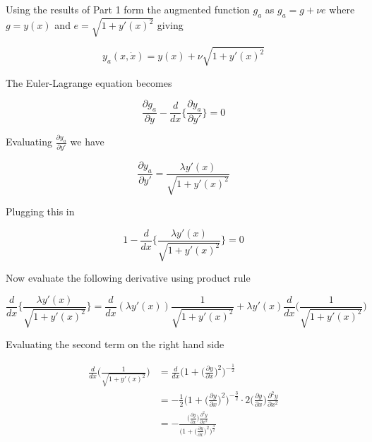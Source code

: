 \documentclass[11pt,letterpaper,onecolumn,notitlepage]{article}
\begin{document}
Using the results of Part 1 form the augmented function $g_{a}$ as $g_{a}=g+\nu e$ where $g=y(x)$ and $e=\sqrt{1+y'(x)^{2}}$ giving

\begin{equation*}
  y_{a}(x,\dot{x})=y(x)+\nu\sqrt{1+y'(x)^{2}}
\end{equation*}

The Euler-Lagrange equation becomes

\begin{equation*}
  \frac{\partial{}g_{a}}{\partial{}y}-\frac{d}{dx}\bigg\{\frac{\partial{}y_{a}}{\partial{}y'}\biggr\}=0
\end{equation*}

Evaluating $\frac{\partial{}y_{a}}{\partial{}y'}$ we have

\begin{equation*}
  \frac{\partial{}y_{a}}{\partial{}y'}=
  \frac{\lambda y'(x)}{\sqrt{1+y'(x)^{2}}}
\end{equation*}

Plugging this in

\begin{equation*}
  1-\frac{d}{dx}\bigg\{\frac{\lambda y'(x)}{\sqrt{1+y'(x)^{2}}}\biggr\}=0
\end{equation*}

Now evaluate the following derivative using product rule

\begin{equation*}
  \frac{d}{dx}\bigg\{\frac{\lambda y'(x)}{\sqrt{1+y'(x)^{2}}}\biggr\}=
  \frac{d}{dx}(\lambda y'(x))\frac{1}{\sqrt{1+y'(x)^{2}}}+
  \lambda y'(x)\frac{d}{dx}\biggr(\frac{1}{\sqrt{1+y'(x)^{2}}}\biggr)
\end{equation*}

Evaluating the second term on the right hand side

\begin{align*}
  \frac{d}{dx}\biggr(\frac{1}{\sqrt{1+y'(x)^{2}}}\biggr)&=
  \frac{d}{dx}\biggr(1+\biggr(\frac{\partial{}y}{\partial{}x}\biggr)^{2}\biggr)^{-\frac{1}{2}} \\
  &=-\frac{1}{2}\biggr(1+\biggr(\frac{\partial{}y}{\partial{}x}\biggr)^{2}\biggr)^{-\frac{3}{2}}\cdot 2\biggr(\frac{\partial{}y}{\partial{}x}\biggr)\frac{\partial^{2}y}{\partial{}x^{2}} \\
  &=-\frac{\bigr(\frac{\partial{}y}{\partial{}x}\bigr)\frac{\partial^{2}y}{\partial{}x^{2}}}{\bigr(1+\bigr(\frac{\partial{}y}{\partial{}x}\bigr)^{2}\bigr)^{\frac{3}{2}}}
\end{align*}
\end{document}
